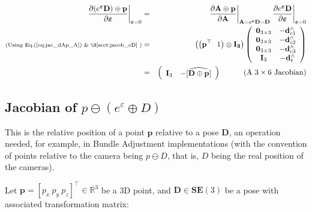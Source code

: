 \documentclass[a4paper,11pt]{report}
\newcommand{\E}{{\bm{\varepsilon}}}
\newcommand{\hatop}[1]{#1^\wedge}
\begin{document}
\begin{eqnarray}
\left. \frac{\partial (e^\E \mathbf{D}) \oplus \mathbf{p} }{\partial \E} \right|_{\E = 0}
&=&
\left. \frac{\partial \mathbf{A} \oplus \mathbf{p}}{\partial \mathbf{A} } \right|_{\mathbf{A}=e^\E \mathbf{D} = \mathbf{D}}
\left. \frac{\partial e^\E \mathbf{D}}{\partial \E} \right|_{\E=0}
\\
\text{\scriptsize{(Using Eq.(\ref{eq:jac_dAp_A}) \& \S\ref{sect:jacob_eD}} )} &=&
\left(\left( \mathbf{p}^\top ~~ 1 \right) \otimes \mathbf{I_3} \right)
\left(
\begin{array}{cc}
 \mathbf{0}_{3\times 3}  & -\hatop{\mathbf{d}}_{c1} \\
 \mathbf{0}_{3\times 3}  & -\hatop{\mathbf{d}}_{c2} \\
 \mathbf{0}_{3\times 3}  & -\hatop{\mathbf{d}}_{c3} \\
 \mathbf{I}_{3}  & -\hatop{\mathbf{d}}_{t} \\
\end{array}
\right)
\\
\label{eq:jacob_eDp_e}
&=&
\left(
\begin{array}{cc}
 \mathbf{I}_3   & - \widehat{ \left[ \mathbf{D} \oplus \mathbf{p} \right]}
\end{array}
\right)
\quad\quad\quad \text{(A $3 \times 6$ Jacobian)}
\end{eqnarray}



\subsection{Jacobian of $p \ominus (e^\varepsilon \oplus D) $}
\label{sect:jacob_eDp_inv}

This is the relative position of a point $\mathbf{p}$ relative to a pose $\mathbf{D}$,
an operation needed, for example, in Bundle Adjustment implementations \cite{triggs2000bundle}
(with the convention of points relative to the camera being $p \ominus D$, that is,
$D$ being the real position of the cameras).

Let $\mathbf{p} = [p_x ~ p_y ~ p_z]^\top \in \mathbb{R}^3$ be a 3D point, and
$\mathbf{D} \in \mathbf{SE}(3)$ be a pose with associated transformation matrix:
\end{document}
